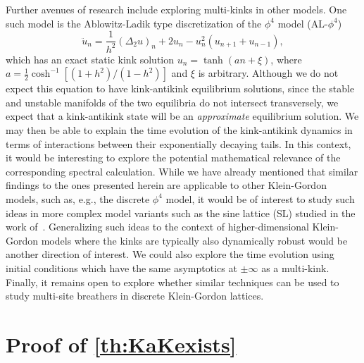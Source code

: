 \documentclass[12pt,reqno]{amsart}
\begin{document}
Further avenues of research include exploring multi-kinks in other models. One such model is the Ablowitz-Ladik type discretization of the $\phi^4$ model (AL-$\phi^4$) \cite{kevrekidis2003}
\begin{equation}
	\ddot{u}_n = \frac{1}{h^2}(\Delta_2 u)_n + 2 u_n - u_n^2 (u_{n+1}+u_{n-1}),
\end{equation}
which has an exact static kink solution $u_n = \tanh(a n + \xi)$, where $a = \frac{1}{2} \cosh^{-1}[(1+h^2)/(1-h^2) ]$ and $\xi$ is arbitrary. Although we do not expect this equation to have kink-antikink equilibrium solutions, since the stable and unstable manifolds of the two equilibria do not intersect transversely, we expect that a kink-antikink state will be an {\it approximate} equilibrium solution. We may then be able to explain the time evolution of the kink-antikink dynamics in terms of interactions between their exponentially decaying tails. 
In this context, it would be interesting to explore the
potential mathematical relevance of the corresponding
spectral calculation.
While we have already mentioned
that similar findings to the ones presented herein
are applicable to other Klein-Gordon models, such as,
e.g., the discrete $\phi^4$ model, it would be of
interest to study such ideas in more complex model variants 
such as the sine lattice (SL) studied in the work
of~\cite{Takeno1986}. 
Generalizing such ideas to the context of higher-dimensional
Klein-Gordon models where the kinks are typically also 
dynamically robust would be another direction of interest.
{We could also explore the time evolution using initial conditions which have the same asymptotics at $\pm \infty$ as a multi-kink.}
Finally, it remains open to explore whether similar techniques 
can be used to study multi-site breathers in discrete 
Klein-Gordon lattices.

\appendix

\section{Proof of \cref{th:KaKexists}}\label{sec:proof1}
\end{document}
